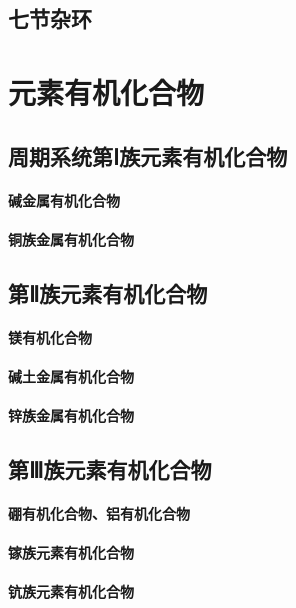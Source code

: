 \documentclass[UTF8]{../03-Chemistry}
\begin{document}
\section{七节杂环}









\chapter{元素有机化合物}
\section{周期系统第Ⅰ族元素有机化合物}
    \subsubsection{碱金属有机化合物}
    \subsubsection{铜族金属有机化合物}
\section{第Ⅱ族元素有机化合物}
    \subsubsection{镁有机化合物}
    \subsubsection{碱土金属有机化合物}
    \subsubsection{锌族金属有机化合物}
\section{第Ⅲ族元素有机化合物}
    \subsubsection{硼有机化合物、铝有机化合物}
    \subsubsection{镓族元素有机化合物}
    \subsubsection{钪族元素有机化合物}
\end{document}
